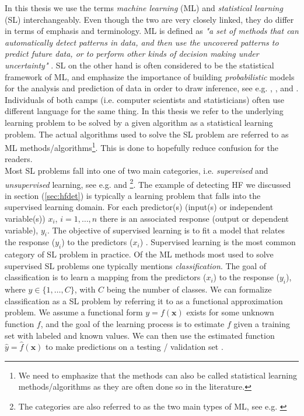 \documentclass[../thesis.tex]{subfiles}
\begin{document}
\noindent In this thesis we use the terms \textit{machine learning} (ML) and \textit{statistical learning} (SL) interchangeably. Even though the two are very closely linked, they do differ in terms of emphasis and terminology. ML is defined as \textit{"a set of methods that can automatically detect patterns in data, and then use the uncovered patterns to predict future data, or to perform other kinds of decision making under uncertainty"} \citep{muphy2012machine}. SL on the other hand is often considered to be the statistical framework of ML, and emphasize the importance of building \textit{probabilistic} models for the analysis and prediction of data in order to draw inference, see e.g. \cite{friedman2009elements}, \cite{muphy2012machine}, \cite{james2013introduction} and \cite{wasserman2013all}. Individuals of both camps (i.e. computer scientists and statisticians) often use different language for the same thing. In this thesis we refer to the underlying learning problem to be solved by a given algorithm as a statistical learning problem. The actual algorithms used to solve the SL problem are referred to as ML methods/algorithms\footnote{We need to emphasize that the methods can also be called statistical learning methods/algorithms as they are often done so in the literature.}. This is done to hopefully reduce confusion for the readers.\\
\indent Most SL problems fall into one of two main categories, i.e. \textit{supervised} and \textit{unsupervised} learning, see e.g. \cite{friedman2009elements} and \cite{james2013introduction}\footnote{The categories are also referred to as the two main types of ML, see e.g. \cite{muphy2012machine}}. The example of detecting  HF we discussed in section (\ref{sec:hfdet}) is typically a learning problem that falls into the supervised learning domain. For each predictor(s) (input(s) or independent variable(s)) $x_i$, $i= 1,\hdots,n$ there is an associated response (output or dependent variable), $y_i$. The objective of supervised learning is to fit a model that relates the response ($y_i$) to the predictors ($x_i$) \citep{james2013introduction}. Supervised learning is the most common category of SL problem in practice. Of the ML methods most used to solve supervised SL problems one typically mentions \textit{classification}. The goal of classification is to learn a mapping from the predictors ($x_i$) to the response ($y_i$), where $y \in \{ 1, \hdots, C\}$, with $C$ being the number of classes. We can formalize classification as a SL problem by referring it to as a functional approximation problem. We assume a functional form $y = f(\mathbf{x})$ exists for some unknown function $f$, and the goal of the learning process is to estimate $f$ given a training set with labeled and known values. We can then use the estimated function $\hat{y} = \hat{f} (\mathbf{x})$ to make predictions on a testing / validation set \citep{muphy2012machine}.\\
\end{document}
